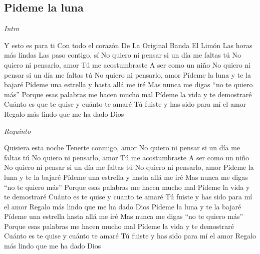 \subsection{Pideme la luna}
\noindent

\vspace{1cm}

\begin{guitar}
	\begin{multicols}{2}
		\textit{Intro}
		\par
		Y esto es para ti
		Con todo el corazón
		De La Original Banda El Limón
		Las horas más lindas
		Las paso contigo, sí
		No quiero ni pensar si un día me faltas tú
		No quiero ni pensarlo, amor
		Tú me acostumbraste
		A ser como un niño
		No quiero ni pensar si un día me faltas tú
		No quiero ni pensarlo, amor
		Pídeme la luna y te la bajaré
		Pídeme una estrella y hasta allá me iré
		Mas nunca me digas ``no te quiero más''
		Porque esas palabras me hacen mucho mal
		Pídeme la vida y te demostraré
		Cuánto es que te quise y cuánto te amaré
		Tú fuiste y has sido para mí el amor
		Regalo más lindo que me ha dado Dios

		\par
		\textit{Requinto}
		\par
		
		Quisiera esta noche
		Tenerte conmigo, amor
		No quiero ni pensar si un día me faltas tú
		No quiero ni pensarlo, amor
		Tú me acostumbraste
		A ser como un niño
		No quiero ni pensar si un día me faltas tú
		No quiero ni pensarlo, amor
		Pídeme la luna y te la bajaré
		Pídeme una estrella y hasta allá me iré
		Mas nunca me digas ``no te quiero más''
		Porque esas palabras me hacen mucho mal
		Pídeme la vida y te demostraré
		Cuánto es te quise y cuanto te amaré
		Tú fuiste y has sido para mí el amor
		Regalo más lindo que me ha dado Dios
		Pídeme la luna y te la bajaré
		Pídeme una estrella hasta allá me iré
		Mas nunca me digas ``no te quiero más''
		Porque esas palabras me hacen mucho mal
		Pídeme la vida y te demostraré
		Cuánto es te quise y cuánto te amaré
		Tú fuiste y has sido para mí el amor
		Regalo más lindo que me ha dado Dios

	\end{multicols}
\end{guitar}
